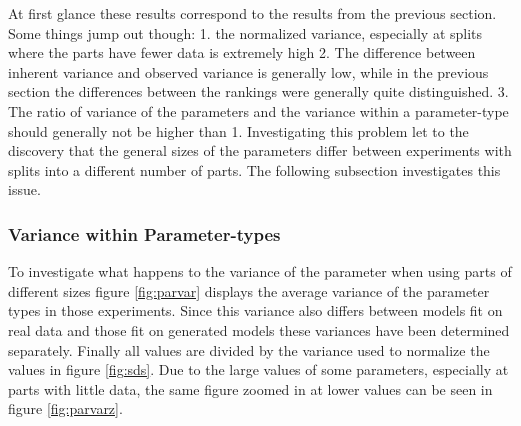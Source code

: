 \documentclass{scrartcl}
\begin{document}
At first glance these results correspond to the results from the previous section. Some things jump out though: 1. the normalized variance, especially at splits where the parts have fewer data is extremely high 2. The difference between inherent variance and observed variance is generally low, while in the previous section the differences between the rankings were generally quite distinguished. 3. The ratio of variance of the parameters and the variance within a parameter-type should generally not be higher than 1. Investigating this problem let to the discovery that the general sizes of the parameters differ between experiments with splits into a different number of parts. The following subsection investigates this issue.




\subsubsection{Variance within Parameter-types}
To investigate what happens to the variance of the parameter when using parts of different sizes figure \ref{fig:parvar} displays the average variance of the parameter types in those experiments. Since this variance also differs between models fit on real data and those fit on generated models these variances have been determined separately. Finally all values are divided by the variance used to normalize the values in figure \ref{fig:sds}. Due to the large values of some parameters, especially at parts with little data, the same figure zoomed in at lower values can be seen in figure \ref{fig:parvarz}. 
\end{document}
